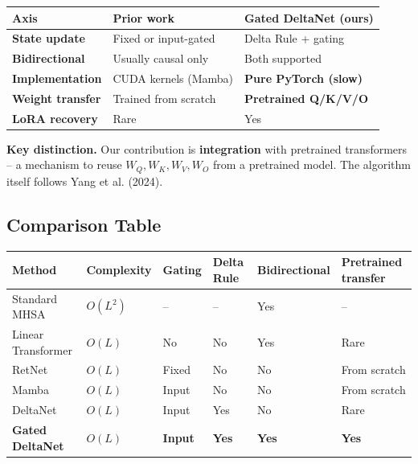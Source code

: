 \begin{table}[H]
\centering
\small
\begin{tabular}{lll}
\toprule
\textbf{Axis} & \textbf{Prior work} & \textbf{Gated DeltaNet (ours)} \\
\midrule
\textbf{State update} & Fixed or input-gated & Delta Rule + gating \\
\textbf{Bidirectional} & Usually causal only & Both supported \\
\textbf{Implementation} & CUDA kernels (Mamba) & \textbf{Pure PyTorch (slow)} \\
\textbf{Weight transfer} & Trained from scratch & \textbf{Pretrained Q/K/V/O} \\
\textbf{LoRA recovery} & Rare & Yes \\
\bottomrule
\end{tabular}
\end{table}

\textbf{Key distinction.} Our contribution is \textbf{integration} with pretrained 
transformers -- a mechanism to reuse $W_Q, W_K, W_V, W_O$ from a pretrained 
model. The algorithm itself follows Yang et al. (2024).



\subsection{Comparison Table}

\begin{table}[H]
\centering
\small
\begin{tabular}{llllll}
\toprule
\textbf{Method} & \textbf{Complexity} & \textbf{Gating} & \textbf{Delta Rule} & \textbf{Bidirectional} & \textbf{Pretrained transfer} \\
\midrule
Standard MHSA & $O(L^2)$ & -- & -- & Yes & -- \\
Linear Transformer & $O(L)$ & No & No & Yes & Rare \\
RetNet & $O(L)$ & Fixed & No & No & From scratch \\
Mamba & $O(L)$ & Input & No & No & From scratch \\
DeltaNet & $O(L)$ & Input & Yes & No & Rare \\
\textbf{Gated DeltaNet} & \textbf{$O(L)$} & \textbf{Input} & \textbf{Yes} & \textbf{Yes} & \textbf{Yes} \\
\bottomrule
\end{tabular}
\end{table}



